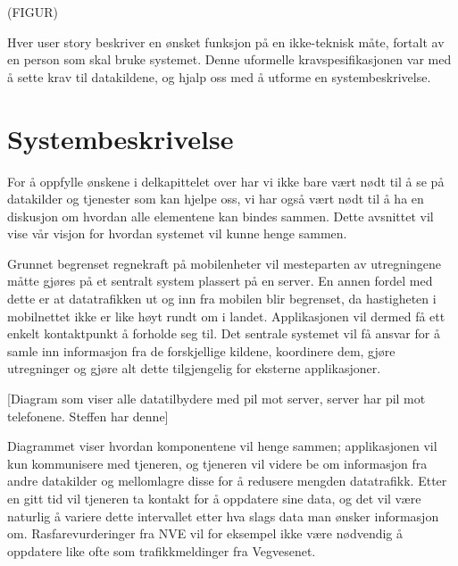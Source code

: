 \documentclass[a4paper,norsk,oneside]{book}
\begin{document}
(FIGUR)

Hver user story beskriver en ønsket funksjon på en ikke-teknisk måte, fortalt av en person som skal bruke systemet. Denne uformelle kravspesifikasjonen var med å sette krav til datakildene, og hjalp oss med å utforme en systembeskrivelse.

\section{Systembeskrivelse}
\label{sec:Systembeskrivelse}

For å oppfylle ønskene i delkapittelet over har vi ikke bare vært nødt til å se på datakilder og tjenester som kan hjelpe oss, vi har også vært nødt til å ha en diskusjon om hvordan alle elementene kan bindes sammen. Dette avsnittet vil vise vår visjon for hvordan systemet vil kunne henge sammen.

Grunnet begrenset regnekraft på mobilenheter vil mesteparten av utregningene måtte gjøres på et sentralt system plassert på en server. En annen fordel med dette er at datatrafikken ut og inn fra mobilen blir begrenset, da hastigheten i mobilnettet ikke er like høyt rundt om i landet. Applikasjonen vil dermed få ett enkelt kontaktpunkt å forholde seg til. Det sentrale systemet vil få ansvar for å samle inn informasjon fra de forskjellige kildene, koordinere dem, gjøre utregninger og gjøre alt dette tilgjengelig for eksterne applikasjoner.

[Diagram som viser alle datatilbydere med pil mot server, server har pil mot telefonene. Steffen har denne]

Diagrammet viser hvordan komponentene vil henge sammen; applikasjonen vil kun kommunisere med tjeneren, og tjeneren vil videre be om informasjon fra andre datakilder og mellomlagre disse for å redusere mengden datatrafikk. Etter en gitt tid vil tjeneren ta kontakt for å oppdatere sine data, og det vil være naturlig å variere dette intervallet etter hva slags data man ønsker informasjon om. Rasfarevurderinger fra NVE vil for eksempel ikke være nødvendig å oppdatere like ofte som trafikkmeldinger fra Vegvesenet.
\end{document}
